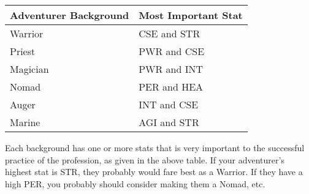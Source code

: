 \begin{normbox}

\small
\begin{tabular}{@{}l l}
\textbf{Adventurer Background} & \textbf{Most Important Stat}\\
\midrule
Warrior & CSE and STR\\
Priest &  PWR and CSE\\
Magician &  PWR and INT\\
Nomad &  PER and HEA\\
Auger &  INT and CSE\\
Marine &  AGI and STR
\end{tabular}
\end{normbox}

Each background has one or more stats that is very important to the successful practice of the profession, as given in the above table. If your adventurer's highest stat is
STR, they probably would fare best as a Warrior. If they have a high PER, you probably should consider making them a Nomad, etc.

